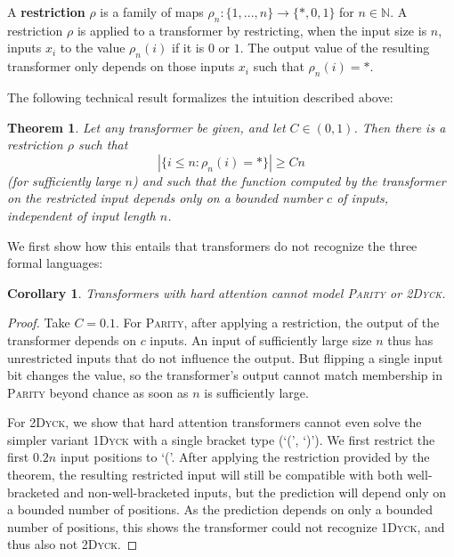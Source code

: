 \documentclass[11pt,a4paper]{article}
\newcounter{theorem}
\newtheorem{corollary}[theorem]{Corollary}
\newtheorem{thm}[theorem]{Theorem}
\newcommand{\key}[1]{\textbf{#1}}
\begin{document}
A \key{restriction} $\rho$ is a family of maps $\rho_n : \{1, ..., n\} \rightarrow \{*, 0, 1\}$ for $n \in \mathbb{N}$.
A restriction $\rho$ is applied to a transformer by restricting, when the input size is $n$, inputs $x_i$ to the value $\rho_n(i)$ if it is $0$ or $1$.
The output value of the resulting transformer only depends on those inputs $x_i$ such that $\rho_n(i) = *$.

The following technical result formalizes the intuition described above:
\begin{thm}\label{thm:hardmax-main}
Let any transformer be given, and let $C \in (0,1)$.
Then there is a restriction $\rho$ such that 
$$|\{i \leq n: \rho_n(i) = *\}| \geq Cn$$
(for sufficiently large $n$) and such that the function computed by the transformer on the restricted input depends only on a bounded number $c$ of inputs, independent of input length $n$.
\end{thm}
We first show how this entails that transformers do not recognize the three formal languages:
\begin{corollary}
Transformers with hard attention cannot model \textsc{Parity} or \textsc{2Dyck}. %
\end{corollary}
\begin{proof}
Take $C=0.1$.
For \textsc{Parity}, after applying a restriction, the output of the transformer depends on $c$ inputs.
An input of sufficiently large size $n$ thus has unrestricted inputs that do not influence the output.
But flipping a single input bit changes the value, so the transformer's output cannot match membership in \textsc{Parity} beyond chance as soon as $n$ is sufficiently large.


For \textsc{2Dyck}, we show that hard attention transformers cannot even solve the simpler variant \textsc{1Dyck} with a single bracket type (`(', `)').
We first restrict the first $0.2n$ input positions to `('.
After applying the restriction provided by the theorem, the resulting restricted input will still be compatible with both well-bracketed and non-well-bracketed inputs, but the prediction will depend only on a bounded number of positions.
As the prediction depends on only a bounded number of positions, this shows the transformer could not recognize \textsc{1Dyck}, and thus also not \textsc{2Dyck}.
%
\end{proof}
\end{document}
